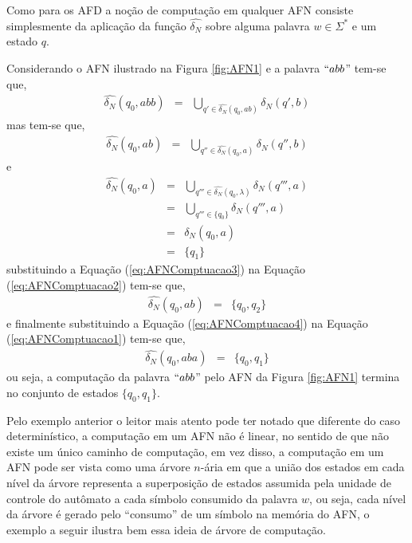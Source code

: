 Como para os AFD a noção de computação em qualquer AFN consiste simplesmente da aplicação da função $\widehat{\delta_N}$ sobre alguma palavra $w \in \Sigma^*$ e um estado $q$. 

\begin{exemplo}\label{exe:ComputacaoAFN}
	Considerando o AFN ilustrado na Figura \ref{fig:AFN1} e a palavra $``abb$'' tem-se que,
	\begin{eqnarray}\label{eq:AFNComptuacao1}
		\widehat{\delta_N}(q_0, abb) & = & \bigcup_{q' \in \widehat{\delta_N}(q_0, ab)} \delta_N(q', b)
	\end{eqnarray}
	mas tem-se que, 
	\begin{eqnarray}\label{eq:AFNComptuacao2}
		 \widehat{\delta_N}(q_0, ab) & = & \bigcup_{q'' \in \widehat{\delta_N}(q_0, a)} \delta_N(q'', b)
	\end{eqnarray}
	e
	\begin{eqnarray}\label{eq:AFNComptuacao3}
		\widehat{\delta_N}(q_0, a) & = & \bigcup_{q''' \in \widehat{\delta_N}(q_0, \lambda)} \delta_N(q''', a) \nonumber \\ 
		& = & \bigcup_{q''' \in \{q_0\}} \delta_N(q''', a) \\
		& = & \delta_N(q_0, a) \nonumber \\ 
		& = & \{q_1\} \nonumber
	\end{eqnarray}
	substituindo a Equação (\ref{eq:AFNComptuacao3}) na Equação (\ref{eq:AFNComptuacao2}) tem-se que, 
	\begin{eqnarray}\label{eq:AFNComptuacao4}
		\widehat{\delta_N}(q_0, ab) & = & \{q_0, q_2\}
	\end{eqnarray}
	e finalmente substituindo a Equação (\ref{eq:AFNComptuacao4}) na Equação (\ref{eq:AFNComptuacao1}) tem-se que,
	 \begin{eqnarray}
	 	\widehat{\delta_N}(q_0, aba) & = & \{q_0, q_1\}
	 \end{eqnarray}
 	ou seja, a computação da palavra $``abb$'' pelo AFN da Figura \ref{fig:AFN1} termina no conjunto de estados $\{q_0, q_1\}$.
\end{exemplo}

Pelo exemplo anterior o leitor mais atento pode ter notado que diferente do caso determinístico, a computação em um AFN não é linear, no sentido de que não existe um único caminho de computação, em vez disso, a computação em um AFN pode ser vista como uma árvore $n$-ária em que a união dos estados em cada nível da árvore representa a superposição de estados assumida pela unidade de controle do autômato a cada símbolo consumido da palavra $w$, ou seja, cada nível da árvore é gerado pelo ``consumo'' de um símbolo na memória do AFN, o exemplo a seguir ilustra bem essa ideia de árvore de computação.


